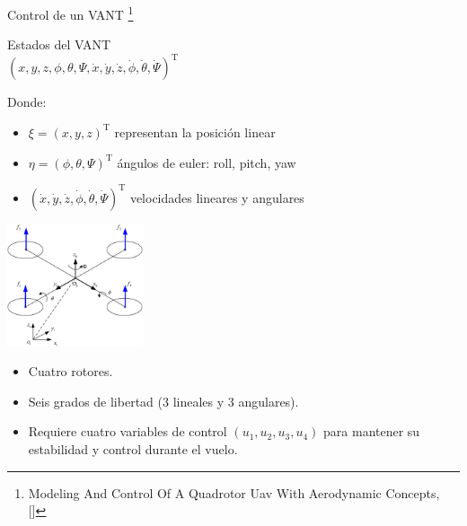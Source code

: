 \documentclass[
  24pt, %
  aspectratio=169, %
]{beamer}
\begin{document}
\begin{frame}{Control de un VANT \footnote{Modeling And Control Of A Quadrotor Uav With Aerodynamic Concepts, [\cite{1334249}]}}
  
  \begin{minipage}{0.47\textwidth}
     
    Estados del VANT \\
    $(x,y,z,\phi,\theta,\Psi,\dot{x},\dot{y},\dot{z},\dot{\phi},\dot{\theta},\dot{\Psi})^\mathrm{T}$

    \bigskip %
    
    Donde:
    \begin{itemize}
    \item $\xi = (x,y,z)^\mathrm{T}$ representan la posición linear
    \item $\eta = (\phi,\theta,\Psi)^\mathrm{T}$ ángulos de euler: roll, pitch, yaw
    \item $(\dot{x},\dot{y},\dot{z},\dot{\phi},\dot{\theta},\dot{\Psi})^\mathrm{T}$ velocidades lineares y angulares
    \end{itemize}
  \end{minipage}
  \hspace{0.2cm}
  \begin{minipage}{0.5\textwidth}
    \centering
    \includegraphics[width=4cm]{uav_model.jpeg}
    \bigskip %
    {\scriptsize
      \begin{itemize}
      \item Cuatro rotores.
      \item Seis grados de libertad (3 lineales y 3 angulares).
      \item Requiere cuatro variables de control $(u_1, u_2, u_3, u_4)$ para mantener su estabilidad y control durante el vuelo.
      \end{itemize}
    }
  \end{minipage}
\end{frame}
\end{document}

